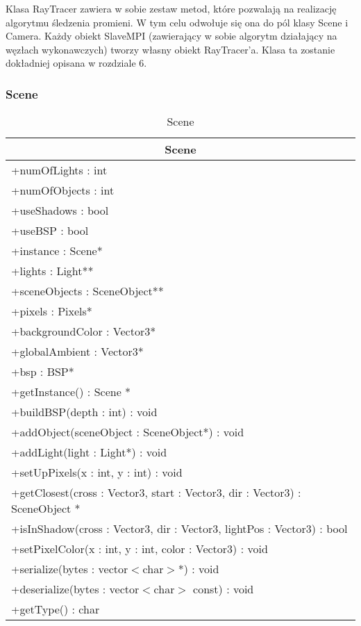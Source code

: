 Klasa RayTracer zawiera w sobie zestaw metod, które pozwalają na realizację algorytmu śledzenia promieni. W tym celu odwołuje się ona do pól klasy Scene i Camera. Każdy obiekt SlaveMPI (zawierający w sobie algorytm działający na węzłach wykonawczych) tworzy własny obiekt RayTracer'a. Klasa ta zostanie dokładniej opisana w rozdziale 6.

\subsubsection{Scene}

\footnotesize
\begin{longtable}{|p{14cm}|}
    \caption{Scene} \label{tab:Scene} \\ \hline
    \multicolumn{1}{|c|}{Scene} \\ \hline
    +numOfLights : int \\
    +numOfObjects : int \\
    +useShadows : bool \\
    +useBSP : bool \\
    +instance : Scene* \\
    +lights : Light** \\
    +sceneObjects : SceneObject** \\
    +pixels : Pixels* \\
    +backgroundColor : Vector3* \\
    +globalAmbient : Vector3* \\
    +bsp : BSP* \\
    \hline
	+getInstance() : Scene * \\
	+buildBSP(depth : int) : void \\
	+addObject(sceneObject : SceneObject*) : void \\
	+addLight(light : Light*) : void \\
	+setUpPixels(x : int, y : int) : void \\
	+getClosest(cross : Vector3, start : Vector3, dir : Vector3) : SceneObject * \\
	+isInShadow(cross : Vector3, dir : Vector3, lightPos : Vector3) : bool \\
	+setPixelColor(x : int, y : int, color : Vector3) : void \\
	+serialize(bytes : vector$<$char$>$*) : void \\
	+deserialize(bytes : vector$<$char$>$ const) : void \\
	+getType() : char \\
	\hline
\end{longtable}
\normalsize

